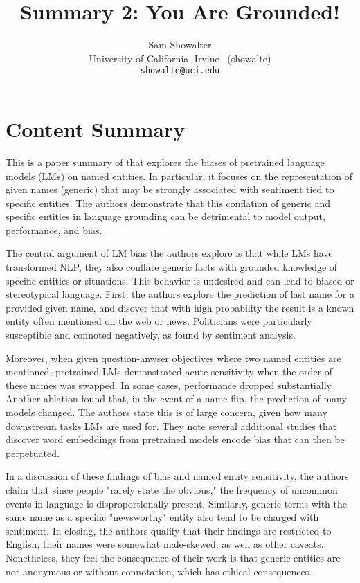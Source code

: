 \documentclass[11pt,a4paper]{article}
\title{Summary 2: You Are Grounded!}
\author{Sam Showalter \\
  University of California, Irvine \ (showalte) \\  
\texttt{showalte@uci.edu}}
\begin{document}
\maketitle

\section{Content Summary}
\label{sec:content_summary}

This is a paper summary of \cite{shwartz2020you} that explores the biases of pretrained language models (LMs) on named entities. In particular, it focuses on the representation of given names (generic) that may be strongly associated with sentiment tied to specific entities. The authors demonstrate that this conflation of generic and specific entities in language grounding can be detrimental to model output, performance, and bias.

The central argument of LM bias the authors explore is that while LMs have transformed NLP, they also conflate generic facts with grounded knowledge of specific entities or situations. This behavior is undesired and can lead to biased or stereotypical language. First, the authors explore the prediction of last name for a provided given name, and disover that with high probability the result is a known entity often mentioned on the web or news. Politicians were particularly susceptible and connoted negatively, as found by sentiment analysis.

Moreover, when given question-anwser objectives where two named entities are mentioned, pretrained LMs demonstrated acute sensitivity when the order of these names was swapped. In some cases, performance dropped substantially. Another ablation found that, in the event of a name flip, the prediction of many models changed. The authors state this is of large concern, given how many downstream tasks LMs are used for. They note several additional studies that discover word embeddings from pretrained models encode bias that can then be perpetuated.

In a discussion of these findings of bias and named entity sensitivity, the authors claim that since people "rarely state the obvious," the frequency of uncommon events in language is disproportionally present. Similarly, generic terms with the same name as a specific "newsworthy" entity also tend to be charged with sentiment. In closing, the authors qualify that their findings are restricted to English, their names were somewhat male-skewed, as well as other caveats. Nonetheless, they feel the consequence of their work is that generic entities are not anonymous or without connotation, which has ethical consequences.
\end{document}
